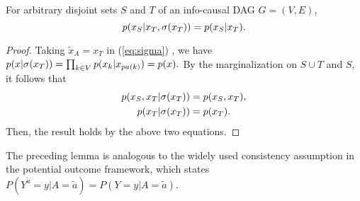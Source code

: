 

\begin{Lem}
	\label{Lem:consistent}
	For arbitrary disjoint sets  $S$ and $T$ of an info-causal DAG $G=(V,E)$,  
	$$
	p(x_S|x_T, \mathrm{\sigma}(x_T)) = p(x_S|x_T).
	$$
\end{Lem}

\begin{proof}
	Taking $\tilde{x}_{A}=x_{T}$ in (\ref{eq:sigma}) , we have $
	p(x|\mathrm{\sigma}(x_T)) = \prod_{k\in V} p(x_k|x_{pa(k)})=p(x).
	$
	By the marginalization on $S \cup T$ and $S$, it follows that 
	\begin{align}
	p(x_S, {x}_T|\mathrm{\sigma}({x}_T)) &= p(x_S, {x}_T),\label{a1} \\
	p({x}_T|\mathrm{\sigma}({x}_T)) &= p({x}_T).\label{a2}
	\end{align}
   Then, the result holds by the above two equations.
\end{proof}

The preceding lemma is analogous to the widely used consistency assumption\cite{VanderWeele2009} in the potential outcome framework, which states
$P(Y^{\tilde{a}} = y | A=\tilde{a}) = P(Y=y|A=\tilde{a})$.





